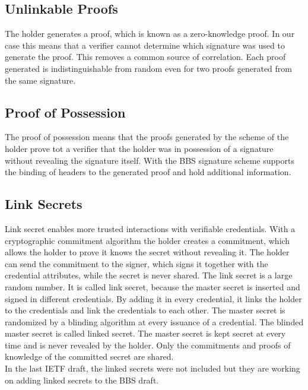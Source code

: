 \documentclass{article}
\begin{document}
\subsection{Unlinkable Proofs}

The holder generates a proof, which is known as a zero-knowledge proof. In our case this means that a verifier cannot determine which signature was used to generate the proof. This removes a common source of correlation. Each proof generated is indistinguishable from random even for two proofs generated from the same signature. \cite{bbs-signature-identity}

\subsection{Proof of Possession}

The proof of possession means that the proofs generated by the scheme of the holder prove tot a verifier that the holder was in possession of a signature without revealing the signature itself. With the BBS signature scheme supports the binding of headers to the generated proof and hold additional information. \cite{bbs-signature-identity}

\subsection{Link Secrets}

Link secret enables more trusted interactions with verifiable credentials. With a cryptographic commitment algorithm the holder creates a commitment, which allows the holder to prove it knows the secret without revealing it. The holder can send the commitment to the signer, which signs it together with the credential attributes, while the secret is never shared. The link secret is a large random number. 
It is called link secret, because the master secret is inserted and signed in different credentials. By adding it in every credential, it links the holder to the credentials and link the credentials to each other. The master secret is randomized by a blinding algorithm at every issuance of a credential. The blinded master secret is called linked secret. The master secret is kept secret at every time and is never revealed by the holder. Only the commitments and proofs of knowledge of the committed secret are shared. \\
In the last IETF draft, the linked secrets were not included but they are working on adding linked secrets to the \gls{BBS} draft.
\cite{bbs-signature-identity}
\end{document}
